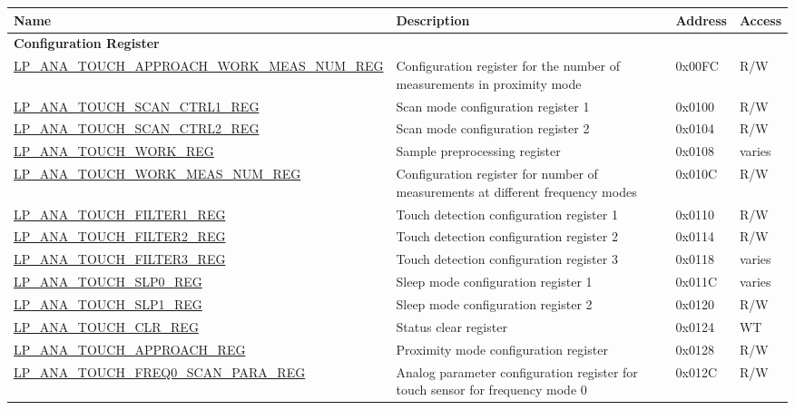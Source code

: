 \begin{longtable}{ | l | p{12cm} | p{1.3cm} | p{1.2cm} | }
\hline\rowcolor{lightgray}
\textbf{Name} & \textbf{Description} &  \textbf{Address} & \textbf{Access} \\ \hline
\endhead
\multicolumn{4}{|l|}{\textbf{Configuration Register}} \\ \hline
\hyperref[regdesc:LPANATOUCHAPPROACHWORKMEASNUMREG]{LP\_ANA\_TOUCH\_APPROACH\_WORK\_MEAS\_NUM\_REG} & Configuration register for the number of measurements in proximity mode & 0x00FC & R/W \\ \hline
\hyperref[regdesc:LPANATOUCHSCANCTRL1REG]{LP\_ANA\_TOUCH\_SCAN\_CTRL1\_REG} & Scan mode configuration register 1 & 0x0100 & R/W \\ \hline
\hyperref[regdesc:LPANATOUCHSCANCTRL2REG]{LP\_ANA\_TOUCH\_SCAN\_CTRL2\_REG} & Scan mode configuration register 2 & 0x0104 & R/W \\ \hline
\hyperref[regdesc:LPANATOUCHWORKREG]{LP\_ANA\_TOUCH\_WORK\_REG} & Sample preprocessing register & 0x0108 & varies \\ \hline
\hyperref[regdesc:LPANATOUCHWORKMEASNUMREG]{LP\_ANA\_TOUCH\_WORK\_MEAS\_NUM\_REG} & Configuration register for number of measurements at different frequency modes & 0x010C & R/W \\ \hline
\hyperref[regdesc:LPANATOUCHFILTER1REG]{LP\_ANA\_TOUCH\_FILTER1\_REG} & Touch detection configuration register 1 & 0x0110 & R/W \\ \hline
\hyperref[regdesc:LPANATOUCHFILTER2REG]{LP\_ANA\_TOUCH\_FILTER2\_REG} & Touch detection configuration register 2 & 0x0114 & R/W \\ \hline
\hyperref[regdesc:LPANATOUCHFILTER3REG]{LP\_ANA\_TOUCH\_FILTER3\_REG} & Touch detection configuration register 3 & 0x0118 & varies \\ \hline
\hyperref[regdesc:LPANATOUCHSLP0REG]{LP\_ANA\_TOUCH\_SLP0\_REG} & Sleep mode configuration register 1 & 0x011C & varies \\ \hline
\hyperref[regdesc:LPANATOUCHSLP1REG]{LP\_ANA\_TOUCH\_SLP1\_REG} & Sleep mode configuration register 2 & 0x0120 & R/W \\ \hline
\hyperref[regdesc:LPANATOUCHCLRREG]{LP\_ANA\_TOUCH\_CLR\_REG} & Status clear register & 0x0124 & WT \\ \hline
\hyperref[regdesc:LPANATOUCHAPPROACHREG]{LP\_ANA\_TOUCH\_APPROACH\_REG} & Proximity mode configuration register & 0x0128 & R/W \\ \hline
\hyperref[regdesc:LPANATOUCHFREQ0SCANPARAREG]{LP\_ANA\_TOUCH\_FREQ0\_SCAN\_PARA\_REG} & Analog parameter configuration register for touch sensor for frequency mode 0 & 0x012C & R/W \\ \hline

\end{longtable}
